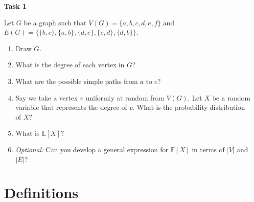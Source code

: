 \documentclass[12pt,letterpaper]{article}
\begin{document}
\textbf{Task 1}

Let $G$ be a graph such that $V(G)=\{a, b, c, d, e, f\}$ and $E(G)=\{\{b, c\}, \{a, b\}, \{d, e\}, \{c, d\}, \{d, b\}\}$.
\begin{enumerate}
    \item Draw $G$.
    \begin{mdframed} \vspace{2cm} \end{mdframed}
    \item What is the degree of each vertex in $G$?
    \begin{mdframed} \vspace{1cm} \end{mdframed}
    \item What are the possible simple paths from $a$ to $e$?
    \begin{mdframed} \vspace{1cm} \end{mdframed}
    \item Say we take a vertex $v$ uniformly at random from $V(G)$. Let $X$ be a random variable that represents the degree of $v$. What is the probability distribution of $X?$
    \begin{mdframed} \vspace{1cm} \end{mdframed}
    \item What is $\mathbb{E}[X]$?
    \begin{mdframed} \vspace{1cm} \end{mdframed}
    \item \textit{Optional:} Can you develop a general expression for $\mathbb{E}[X]$ in terms of $|V|$ and $|E|$?
    \begin{mdframed} \vspace{1cm} \end{mdframed}
\end{enumerate}

\newpage
\section*{Definitions}
\end{document}
